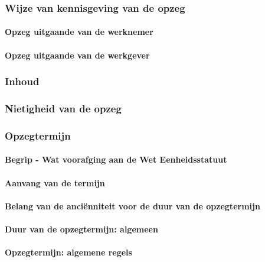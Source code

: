 \subsubsection{Wijze van kennisgeving van de opzeg}

\paragraph{Opzeg uitgaande van de werknemer}

\paragraph{Opzeg uitgaande van de werkgever}

\subsubsection{Inhoud}

\subsubsection{Nietigheid van de opzeg}

\subsubsection{Opzegtermijn}

\paragraph{Begrip - Wat voorafging aan de Wet Eenheidsstatuut}

\paragraph{Aanvang van de termijn}

\paragraph{Belang van de anciënniteit voor de duur van de opzegtermijn}

\paragraph{Duur van de opzegtermijn: algemeen}

\paragraph{Opzegtermijn: algemene regels}

